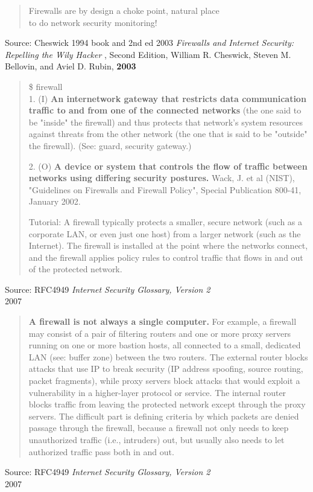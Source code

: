 \documentclass[Screen16to9,17pt]{foils}
\begin{document}
\begin{quote}
Firewalls are by design a choke point, natural place \\
to do network security monitoring!
\end{quote}

Source: Cheswick 1994 book and 2nd ed 2003
\emph{Firewalls and Internet Security: Repelling the Wily Hacker} , Second Edition, William R. Cheswick, Steven M. Bellovin, and Aviel D. Rubin, {\bf 2003}





\begin{quote}\small
\$ firewall\\

1. (I) {\bf An internetwork gateway that restricts data communication traffic to and from one of the connected networks} (the one said to be "inside" the firewall) and thus protects that network's system resources against threats from the other network (the one that is said to be "outside" the firewall). (See: guard, security gateway.)

2. (O) {\bf A device or system that controls the flow of traffic between networks using differing security postures.} Wack, J. et al (NIST), "Guidelines on Firewalls and Firewall Policy", Special Publication 800-41, January 2002.

Tutorial: A firewall typically protects a smaller, secure network (such as a corporate LAN, or even just one host) from a larger network (such as the Internet). The firewall is installed at the point where the networks connect, and the firewall applies policy rules to control traffic that flows in and out of the protected network.
\end{quote}
{\footnotesize Source: RFC4949 \emph{Internet Security Glossary, Version 2}\\
 2007}

\begin{quote}\small
{\bf A firewall is not always a single computer.} For example, a firewall may consist of a pair of filtering routers and one or more proxy servers running on one or more bastion hosts, all connected to a small, dedicated LAN (see: buffer zone) between the two routers. The external router blocks attacks that use IP to break security (IP address spoofing, source routing, packet fragments), while proxy servers block attacks that would exploit a vulnerability in a higher-layer protocol or service. The internal router blocks traffic from leaving the protected network except through the proxy servers. The difficult part is defining criteria by which packets are denied passage through the firewall, because a firewall not only needs to keep unauthorized traffic (i.e., intruders) out, but usually also needs to let authorized traffic pass both in and out.
\end{quote}
{\footnotesize Source: RFC4949 \emph{Internet Security Glossary, Version 2}\\
 2007}
\end{document}
